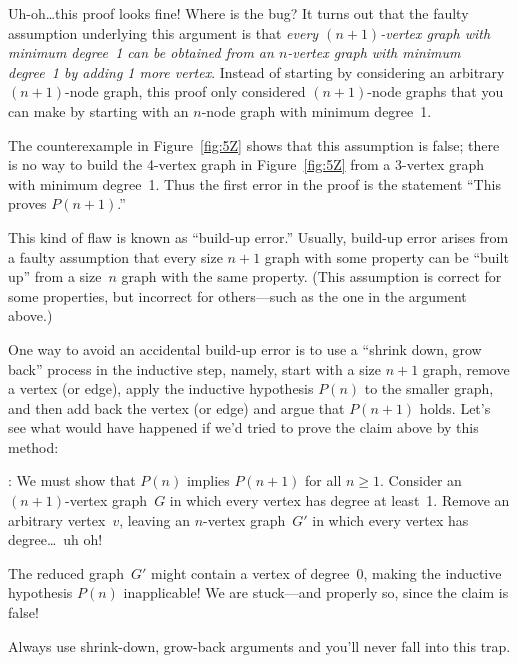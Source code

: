 Uh-oh\dots this proof looks fine!  Where is the bug?  It turns out
that the faulty assumption underlying this argument is that
\emph{every $(n + 1)$-vertex graph with minimum degree~1 can be
obtained from an $n$-vertex graph with minimum degree~1 by adding 1
more vertex}.  Instead of starting by considering an arbitrary $(n +
1)$-node graph, this proof only considered $(n + 1)$-node graphs
that you can make by starting with an $n$-node graph with minimum
degree~1.

The counterexample in Figure~\ref{fig:5Z} shows that this assumption
is false; there is no way to build the 4-vertex graph in
Figure~\ref{fig:5Z} from a 3-vertex graph with minimum degree~1.
Thus the first error in the proof is the statement ``This proves
$P(n + 1)$.''

This kind of flaw is known as ``build-up error.''  Usually, build-up
error arises from a faulty assumption that every size $n + 1$ graph
with some property can be ``built up'' from a size~$n$ graph with the
same property.  (This assumption is correct for some properties, but
incorrect for others---such as the one in the argument above.)

One way to avoid an accidental build-up error is to use a ``shrink
down, grow back'' process in the inductive step, namely, start with a
size $n+1$ graph, remove a vertex (or edge), apply the inductive
hypothesis $P(n)$ to the smaller graph, and then add back the vertex
(or edge) and argue that $P(n + 1)$ holds.  Let's see what would have
happened if we'd tried to prove the claim above by this method:

: We must show that $P(n)$
implies $P(n + 1)$ for all $n \ge 1$.  Consider an $(n + 1)$-vertex
graph~$G$ in which every vertex has degree at least~1.  Remove an
arbitrary vertex~$v$, leaving an $n$-vertex graph~$G'$ in which every
vertex has degree\dots\ uh oh!

The reduced graph~$G'$ might contain a vertex of degree~0, making the
inductive hypothesis $P(n)$ inapplicable!  We are stuck---and
properly so, since the claim is false!

Always use shrink-down, grow-back arguments and you'll never fall into
this trap.



\begin{problems}
\classproblems
{}
\homeworkproblems
{}


\homeworkproblems
{}
\end{problems}

